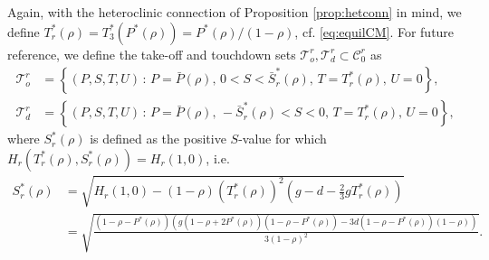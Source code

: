 \documentclass[a4paper,10pt,abstract=true,parskip=true]{scrartcl}
\theoremstyle{remark}
\numberwithin{equation}{section}
\numberwithin{thm}{section}
\begin{document}
Again, with the heteroclinic connection of Proposition \ref{prop:hetconn} in mind, we define $T^\ast_r(\rho) = T^\ast_3(P^\ast(\rho)) = P^\ast(\rho)/(1-\rho)$, cf. \eqref{eq:equilCM}. For future reference, we define the take-off and touchdown sets $\mathcal{T}_o^r, \mathcal{T}_d^r \subset \mathcal{C}_0^r$ as
\begin{equation} \label{eq:totdr}
\begin{aligned}
    \mathcal{T}_o^r &= \left\{ (P, S, T, U) \, : \, P=\bar{P}(\rho), \, 0 < S < \bar{S}^\ast_r(\rho),\, T=T^\ast_r(\rho), \, U =0  \right\}, \\
    \mathcal{T}_d^r &= \left\{ (P, S, T, U) \, : \, P=\bar{P}(\rho), \,  - \bar{S}^\ast_r(\rho) < S < 0,\, T=T^\ast_r(\rho), \, U =0  \right\},
\end{aligned}
\end{equation}
where $S^\ast_r(\rho)$ is defined as the positive $S$-value for which $H_r(T^\ast_r(\rho),S^\ast_r(\rho)) = H_r(1,0)$, i.e.
\begin{align}\label{eq:Sr}
    S^\ast_r(\rho) &= \sqrt{H_r(1,0) - (1-\rho)(T^\ast_r(\rho))^2\left(g-d-\frac{2}{3}g T^\ast_r(\rho)\right)}\\
    &= \sqrt{\frac{(1-\rho-P^\ast(\rho))\left(g(1-\rho+2 P^\ast(\rho))(1-\rho-P^\ast(\rho)) - 3 d (1-\rho-P^\ast(\rho))(1-\rho)\right)}{3(1-\rho)^2}}.~\nonumber
\end{align}
\end{document}
